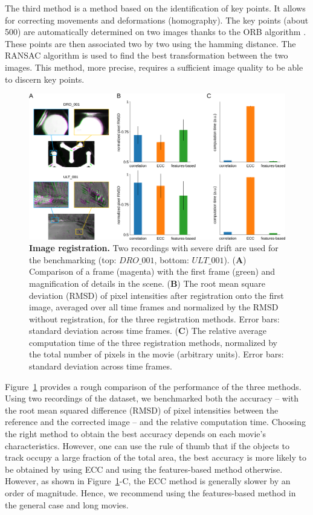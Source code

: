     The third method is a method based on the identification of key points. It allows for correcting movements and deformations (homography). The key points (about 500) are automatically determined on two images thanks to the ORB algorithm \cite{rublee2011orb}. These points are then associated two by two using the hamming distance. The RANSAC algorithm \cite{bolles1981ransac} is used to find the best transformation between the two images. This method, more precise, requires a sufficient image quality to be able to discern key points.

    \begin{figure}[h!]
    \centering
    \includegraphics[width=1\textwidth]{part_1/assets/Figure_2.png}
    \caption{{\bf Image registration.} Two recordings with severe drift are used for the benchmarking (top: $DRO\_001$, bottom: $ULT\_001$).
        (\textbf{A}) Comparison of a frame (magenta) with the first frame (green) and magnification of details in the scene.
        (\textbf{B}) The root mean square deviation (RMSD) of pixel intensities after registration onto the first image, averaged over all time frames and normalized by the RMSD without registration, for the three registration methods. Error bars: standard deviation across time frames.
        (\textbf{C}) The relative average computation time of the three registration methods, normalized by the total number of pixels in the movie (arbitrary units). Error bars: standard deviation across time frames.}
    \label{part_1:fig_2}
    \end{figure}

    Figure~\ref{part_1:fig_2} provides a rough comparison of the performance of the three methods. Using two recordings of the dataset, we benchmarked both the accuracy – with the root mean squared difference (RMSD) of pixel intensities between the reference and the corrected image – and the relative computation time. Choosing the right method to obtain the best accuracy depends on each movie’s characteristics. However, one can use the rule of thumb that if the objects to track occupy a large fraction of the total area, the best accuracy is more likely to be obtained by using ECC and using the features-based method otherwise. However, as shown in Figure~\ref{part_1:fig_2}-C, the ECC method is generally slower by an order of magnitude. Hence, we recommend using the features-based method in the general case and long movies.

